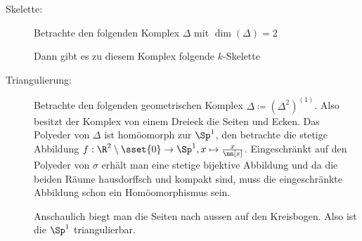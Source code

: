 \begin{Bsp}
  \begin{description}
  \item[Skelette:] Betrachte den folgenden Komplex $\Delta$ mit $\dim(\Delta)=2$\\
    \begin{center}
  \end{center}
  Dann gibt es zu diesem Komplex folgende $k$-Skelette\\
  \begin{center}
    \parbox{0.7\linewidth}{%
  \hfill
  }
\end{center}  

\item[Triangulierung:] Betrachte den folgenden geometrischen Komplex
  $\Delta \coloneqq (\Delta^2)^{(1)}$. Also besitzt der Komplex von
  einem Dreieck die Seiten und Ecken. Das Polyeder von $\Delta$ ist
  homöomorph zur $\Sp^1$, den betrachte die stetige Abbildung
  $f : \R^2 \setminus \sset{0} \rightarrow \Sp^1 , x \mapsto
  \frac{x}{\nn[x]}$.
  Eingeschränkt auf den Polyeder von $\sigma$ erhält man eine stetige
  bijektive Abbildung und da die beiden Räume hausdorffsch und kompakt
  sind, muss die eingeschränkte Abbildung schon ein Homöomorphismus
  sein. 
  \begin{center}
\end{center}
Anschaulich biegt man die Seiten nach aussen auf den Kreisbogen.  Also
ist die $\Sp^1$ triangulierbar.
\end{description}
\end{Bsp}

